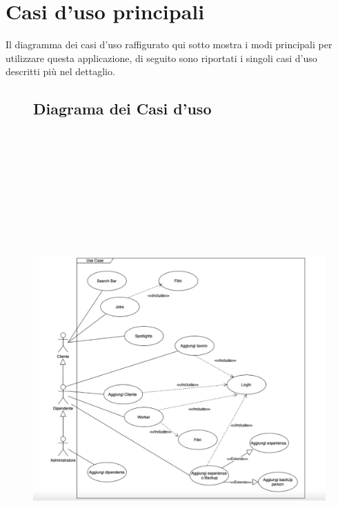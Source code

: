 \documentclass[ 4paper,11pt,openany]{book}
\begin{document}
\section{Casi d'uso principali}
Il diagramma dei casi d'uso raffigurato qui sotto mostra i modi principali per utilizzare questa applicazione, di seguito sono riportati i singoli casi d'uso descritti più nel dettaglio.
\begin{figure}[htpb!] 
	\subsection{Diagrama dei Casi d'uso}
	\includegraphics[height=190mm,width=180mm]{UseCase.jpeg}
\end{figure}
\end{document}
